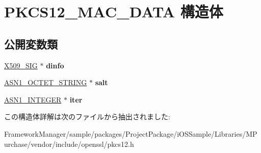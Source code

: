 \hypertarget{struct_p_k_c_s12___m_a_c___d_a_t_a}{}\section{P\+K\+C\+S12\+\_\+\+M\+A\+C\+\_\+\+D\+A\+T\+A 構造体}
\label{struct_p_k_c_s12___m_a_c___d_a_t_a}
\subsection*{公開変数類}
\begin{DoxyCompactItemize}
\item 
\hypertarget{struct_p_k_c_s12___m_a_c___d_a_t_a_af1f129d63901a78afc5efe5b7e20ceff}{}\hyperlink{struct_x509__sig__st}{X509\+\_\+\+S\+I\+G} $\ast$ {\bfseries dinfo}\label{struct_p_k_c_s12___m_a_c___d_a_t_a_af1f129d63901a78afc5efe5b7e20ceff}

\item 
\hypertarget{struct_p_k_c_s12___m_a_c___d_a_t_a_aa20b01b05e8dc10b03a8f49a1c683559}{}\hyperlink{structasn1__string__st}{A\+S\+N1\+\_\+\+O\+C\+T\+E\+T\+\_\+\+S\+T\+R\+I\+N\+G} $\ast$ {\bfseries salt}\label{struct_p_k_c_s12___m_a_c___d_a_t_a_aa20b01b05e8dc10b03a8f49a1c683559}

\item 
\hypertarget{struct_p_k_c_s12___m_a_c___d_a_t_a_a7c5060546ea3ebee4d8bf1b087f6e567}{}\hyperlink{structasn1__string__st}{A\+S\+N1\+\_\+\+I\+N\+T\+E\+G\+E\+R} $\ast$ {\bfseries iter}\label{struct_p_k_c_s12___m_a_c___d_a_t_a_a7c5060546ea3ebee4d8bf1b087f6e567}

\end{DoxyCompactItemize}


この構造体詳解は次のファイルから抽出されました\+:\begin{DoxyCompactItemize}
\item 
Framework\+Manager/sample/packages/\+Project\+Package/i\+O\+S\+Sample/\+Libraries/\+M\+Purchase/vendor/include/openssl/pkcs12.\+h\end{DoxyCompactItemize}

